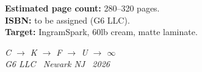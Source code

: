 \documentclass[12pt, oneside]{book}
\begin{document}
\bigskip
\noindent\textbf{Estimated page count:} 280--320 pages.\\
\textbf{ISBN:} to be assigned (G6 LLC).\\
\textbf{Target:} IngramSpark, 60lb cream, matte laminate.

\vspace{0.5cm}

\begin{center}
\itshape
C \;$\to$\; K \;$\to$\; F \;$\to$\; U \;$\to$\; $\infty$\\[0.3em]
\normalfont\small G6 LLC \textperiodcentered\ Newark NJ
\textperiodcentered\ 2026
\end{center}
\end{document}
